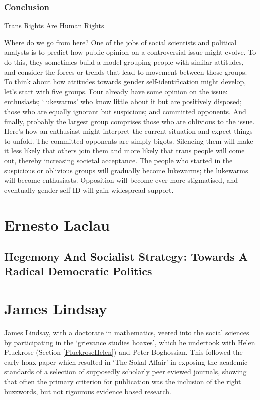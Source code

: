 \documentclass[10pt,titlepage]{book}
\begin{document}
\subsubsection{Conclusion}

Trans Rights Are Human Rights

Where do we go from here? One of the jobs of social scientists and political analysts is to predict how public opinion on a controversial issue might evolve. To do this, they sometimes build a model grouping people with similar attitudes, and consider the forces or trends that lead to movement between those groups. To think about how attitudes towards gender self-identification might develop, let’s start with five groups. Four already have some opinion on the issue: enthusiasts; ‘lukewarms’ who know little about it but are positively disposed; those who are equally ignorant but suspicious; and committed opponents. And finally, probably the largest group comprises those who are oblivious to the issue. Here’s how an enthusiast might interpret the current situation and expect things to unfold. The committed opponents are simply bigots. Silencing them will make it less likely that others join them and more likely that trans people will come out, thereby increasing societal acceptance. The people who started in the suspicious or oblivious groups will gradually become lukewarms; the lukewarms will become enthusiasts. Opposition will become ever more stigmatised, and eventually gender self-ID will gain widespread support.


\section{Ernesto Laclau}\label{LaclauErnesto}

\subsection{Hegemony And Socialist Strategy: Towards A Radical Democratic Politics \cite{laclau-hegsoc}}

\section{James Lindsay}\label{LindsayJames}

James Lindsay, with a doctorate in mathematics, veered into the social sciences by participating in the `grievance studies hoaxes', which he undertook with Helen Pluckrose (Section \ref{PluckroseHelen}) and Peter Boghossian.
This followed the early hoax paper which resulted in `The Sokal Affair' \cite{sokal1998} in exposing the academic standards of a selection of supposedly scholarly peer eviewed journals, showing that often the primary criterion for publication was the inclusion of the right buzzwords, but not rigourous evidence based research.
\end{document}
